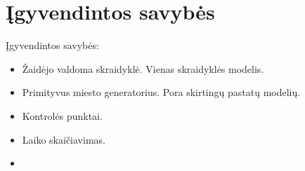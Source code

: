 \section{Įgyvendintos savybės}


Įgyvendintos savybės:
\begin{itemize}
\item Žaidėjo valdoma skraidyklė.
    Vienas skraidyklės modelis.
\item Primityvus miesto generatorius.
    Pora skirtingų pastatų modelių.
\item Kontrolės punktai.
\item Laiko skaičiavimas.
\item {}
\end{itemize}
